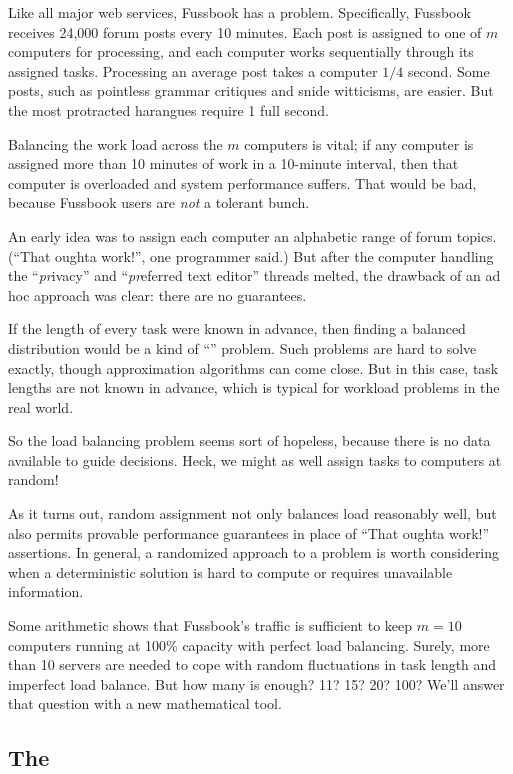Like all major web services, Fussbook has a  problem.
Specifically, Fussbook receives 24,000 forum posts every 10 minutes.
Each post is assigned to one of $m$ computers for processing, and each
computer works sequentially through its assigned tasks.  Processing an
average post takes a computer $1/4$ second.  Some posts, such as
pointless grammar critiques and snide witticisms, are easier.  But the
most protracted harangues require 1 full second.

Balancing the work load across the $m$ computers is vital; if any
computer is assigned more than 10 minutes of work in a 10-minute
interval, then that computer is overloaded and system performance
suffers.  That would be bad, because Fussbook users are \emph{not} a
tolerant bunch.

An early idea was to assign each computer an alphabetic range of forum
topics.  (``That oughta work!'', one programmer said.)  But after the
computer handling the ``\emph{pr}ivacy'' and ``\emph{pr}eferred text
editor'' threads melted, the drawback of an ad hoc approach was clear:
there are no guarantees.

If the length of every task were known in advance, then finding a
balanced distribution would be a kind of ``''
problem.  Such problems are hard to solve exactly, though
approximation algorithms can come close.  But in this case, task
lengths are not known in advance, which is typical for workload
problems in the real world.

So the load balancing problem seems sort of hopeless, because there is
no data available to guide decisions.  Heck, we might as well assign
tasks to computers at random!

As it turns out, random assignment not only balances load reasonably
well, but also permits provable performance guarantees in place of
``That oughta work!''  assertions.  In general, a randomized approach
to a problem is worth considering when a deterministic solution is
hard to compute or requires unavailable information.

Some arithmetic shows that Fussbook's traffic is sufficient to keep $m
= 10$ computers running at 100\% capacity with perfect load balancing.
Surely, more than 10 servers are needed to cope with random
fluctuations in task length and imperfect load balance.  But how many
is enough?  11?  15?  20?  100? We'll answer that question with a new
mathematical tool.

\subsection{The }\label{chernoff_sec}

